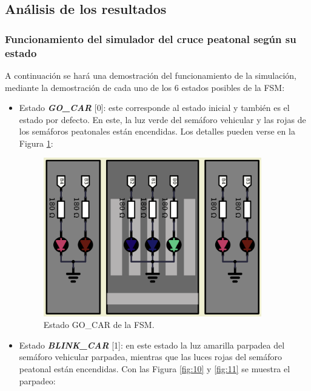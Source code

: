 \subsection{Análisis de los resultados}

\subsubsection{Funcionamiento del simulador del cruce peatonal según su estado}

A continuación se hará una demostración del funcionamiento de la simulación, mediante la demostración de cada uno de los 6 estados posibles de la FSM: 

\begin{itemize}
    \item Estado \textbf{\textit{GO\_CAR}} [0]: este corresponde al estado inicial y también es el estado por defecto. En este, la luz verde del semáforo vehicular y las rojas de los semáforos peatonales están encendidas. Los detalles pueden verse en la Figura \ref{fig:0}: 

    \begin{figure}[H]
    \centering
    \includegraphics[width=95mm]{./Figuras/Desarrollo_Analisis/0}
    \caption{Estado GO\_CAR de la FSM.} 
    \label{fig:0}
    \end{figure}
    
    \item Estado \textbf{\textit{BLINK\_CAR}} [1]: en este estado la luz amarilla parpadea del semáforo vehicular parpadea, mientras que las luces rojas del semáforo peatonal están encendidas. Con las Figura \ref{fig:10} y \ref{fig:11} se muestra el parpadeo:


\end{itemize}
